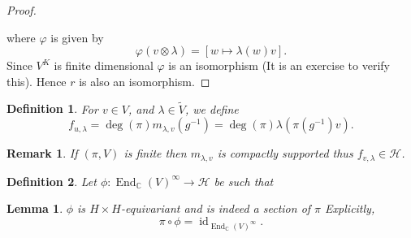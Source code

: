 \documentclass[8pt]{article}
\newtheorem{definition}{Definition}[section]
\newtheorem{lemma}{Lemma}[section]
\newtheorem{remark}{Remark}[section]
\DeclareMathOperator{\End}{End}
\DeclareMathOperator{\id}{id}
\newcommand{\C}[0]{\mathbb{C}}
\newcommand{\hecke}[0]{\mathscr{H}}
\begin{document}
\begin{proof}
\begin{center}
  \end{center}
  where $\varphi$ is given by 
  \begin{equation*}
    \varphi(v\otimes \lambda)=[w\mapsto \lambda(w)v].
  \end{equation*}
  Since $V^K$ is finite dimensional $\varphi$ is an isomorphism (It is an exercise to verify this). Hence $r$ is also an isomorphism.
\end{proof}

\begin{definition}
  For $v\in V$, and $\lambda\in\widetilde{V}$, we define 
  \begin{equation*}
    f_{u,\lambda} = \deg(\pi)m_{\lambda,v}(g^{-1}) = \deg(\pi)\lambda(\pi(g^{-1})v).
  \end{equation*}
\end{definition}

\begin{remark}
  If $(\pi,V)$ is finite then $m_{\lambda,v}$ is compactly supported thus $f_{v,\lambda}\in\hecke$.
\end{remark}

\begin{definition}
  Let $\phi:\End_\C(V)^\infty\to\hecke$ be such that 
  \begin{center}
  \end{center}
\end{definition}

\begin{lemma}
  $\phi$ is $H\times H$-equivariant and is indeed a section of $\pi$ Explicitly, 
  \begin{equation*}
  \pi\circ\phi=\id_{\End_\C(V)^\infty}.
  \end{equation*}
  \label{lemma_22}
\end{lemma}
\end{document}

